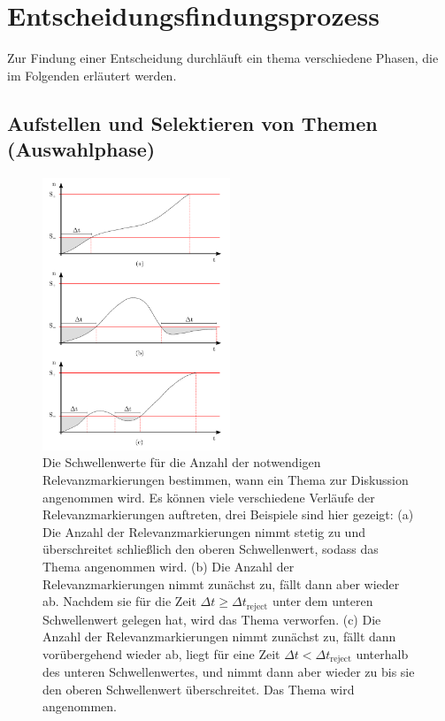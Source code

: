 \documentclass[10pt]{article}
\begin{document}
\section{Entscheidungsfindungsprozess}

Zur Findung einer Entscheidung durchläuft ein \gls{thema} verschiedene Phasen, die im Folgenden erläutert werden.

\subsection{Aufstellen und Selektieren von Themen (Auswahlphase)}

\begin{figure}[!t]
	\centering
	\includegraphics[width=0.5\textwidth]{schwellen_v3.pdf}
	\caption{Die Schwellenwerte für die Anzahl der notwendigen Relevanzmarkierungen bestimmen, wann ein Thema zur Diskussion angenommen wird. Es können viele verschiedene Verläufe der Relevanzmarkierungen auftreten, drei Beispiele sind hier gezeigt: (a) Die Anzahl der Relevanzmarkierungen nimmt stetig zu und überschreitet schließlich den oberen Schwellenwert, sodass das Thema angenommen wird. (b) Die Anzahl der Relevanzmarkierungen nimmt zunächst zu, fällt dann aber wieder ab. Nachdem sie für die Zeit $\Delta t \geq \Delta t_\text{reject}$ unter dem unteren Schwellenwert gelegen hat, wird das Thema verworfen. (c) Die Anzahl der Relevanzmarkierungen nimmt zunächst zu, fällt dann vorübergehend wieder ab, liegt für eine Zeit $\Delta t < \Delta t_\text{reject}$ unterhalb des unteren Schwellenwertes, und nimmt dann aber wieder zu bis sie den oberen Schwellenwert überschreitet. Das Thema wird angenommen.} \label{fig.schwellenwerte}
\end{figure}
\end{document}
